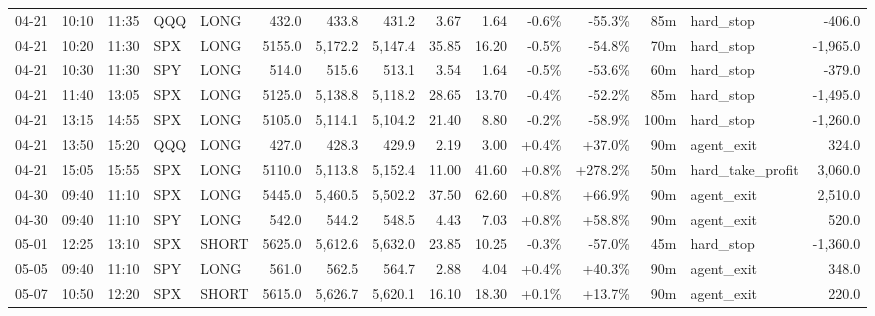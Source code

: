 \documentclass[11pt,a4paper,twoside]{article}
\begin{document}
\begin{landscape}
\begin{center}
\begin{longtable}{>{\color{txtmain}}l l l l l r r r r r r r r >{\color{txtmain}}l r}
04-21 & 10:10 & 11:35 & QQQ & LONG & 432.0 & 433.8 & 431.2 & 3.67 & 1.64 & \textcolor{lossred}{-0.6\%} & \textcolor{lossred}{-55.3\%} & 85m & hard\_stop & \textcolor{lossred}{-406.0} \\
04-21 & 10:20 & 11:30 & SPX & LONG & 5155.0 & 5,172.2 & 5,147.4 & 35.85 & 16.20 & \textcolor{lossred}{-0.5\%} & \textcolor{lossred}{-54.8\%} & 70m & hard\_stop & \textcolor{lossred}{-1,965.0} \\
04-21 & 10:30 & 11:30 & SPY & LONG & 514.0 & 515.6 & 513.1 & 3.54 & 1.64 & \textcolor{lossred}{-0.5\%} & \textcolor{lossred}{-53.6\%} & 60m & hard\_stop & \textcolor{lossred}{-379.0} \\
04-21 & 11:40 & 13:05 & SPX & LONG & 5125.0 & 5,138.8 & 5,118.2 & 28.65 & 13.70 & \textcolor{lossred}{-0.4\%} & \textcolor{lossred}{-52.2\%} & 85m & hard\_stop & \textcolor{lossred}{-1,495.0} \\
04-21 & 13:15 & 14:55 & SPX & LONG & 5105.0 & 5,114.1 & 5,104.2 & 21.40 & 8.80 & \textcolor{lossred}{-0.2\%} & \textcolor{lossred}{-58.9\%} & 100m & hard\_stop & \textcolor{lossred}{-1,260.0} \\
04-21 & 13:50 & 15:20 & QQQ & LONG & 427.0 & 428.3 & 429.9 & 2.19 & 3.00 & \textcolor{wingreen}{+0.4\%} & \textcolor{wingreen}{+37.0\%} & 90m & agent\_exit & \textcolor{wingreen}{324.0} \\
04-21 & 15:05 & 15:55 & SPX & LONG & 5110.0 & 5,113.8 & 5,152.4 & 11.00 & 41.60 & \textcolor{wingreen}{+0.8\%} & \textcolor{wingreen}{+278.2\%} & 50m & hard\_take\_profit & \textcolor{wingreen}{3,060.0} \\
04-30 & 09:40 & 11:10 & SPX & LONG & 5445.0 & 5,460.5 & 5,502.2 & 37.50 & 62.60 & \textcolor{wingreen}{+0.8\%} & \textcolor{wingreen}{+66.9\%} & 90m & agent\_exit & \textcolor{wingreen}{2,510.0} \\
04-30 & 09:40 & 11:10 & SPY & LONG & 542.0 & 544.2 & 548.5 & 4.43 & 7.03 & \textcolor{wingreen}{+0.8\%} & \textcolor{wingreen}{+58.8\%} & 90m & agent\_exit & \textcolor{wingreen}{520.0} \\
05-01 & 12:25 & 13:10 & SPX & SHORT & 5625.0 & 5,612.6 & 5,632.0 & 23.85 & 10.25 & \textcolor{lossred}{-0.3\%} & \textcolor{lossred}{-57.0\%} & 45m & hard\_stop & \textcolor{lossred}{-1,360.0} \\
05-05 & 09:40 & 11:10 & SPY & LONG & 561.0 & 562.5 & 564.7 & 2.88 & 4.04 & \textcolor{wingreen}{+0.4\%} & \textcolor{wingreen}{+40.3\%} & 90m & agent\_exit & \textcolor{wingreen}{348.0} \\
05-07 & 10:50 & 12:20 & SPX & SHORT & 5615.0 & 5,626.7 & 5,620.1 & 16.10 & 18.30 & \textcolor{wingreen}{+0.1\%} & \textcolor{wingreen}{+13.7\%} & 90m & agent\_exit & \textcolor{wingreen}{220.0} \\

\end{longtable}
\end{center}
\end{landscape}
\end{document}
